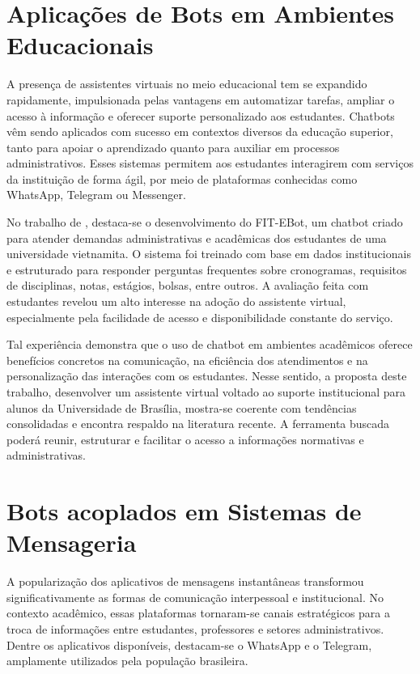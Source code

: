 \section{Aplicações de Bots em Ambientes Educacionais}

A presença de assistentes virtuais no meio educacional tem se expandido rapidamente, impulsionada pelas vantagens em automatizar tarefas, ampliar o acesso à informação e oferecer suporte personalizado aos estudantes. Chatbots vêm sendo aplicados com sucesso em contextos diversos da educação superior, tanto para apoiar o aprendizado quanto para auxiliar em processos administrativos. Esses sistemas permitem aos estudantes interagirem com serviços da instituição de forma ágil, por meio de plataformas conhecidas como WhatsApp, Telegram ou Messenger.

No trabalho de , destaca-se o desenvolvimento do FIT-EBot, um chatbot criado para atender demandas administrativas e acadêmicas dos estudantes de uma universidade vietnamita. O sistema foi treinado com base em dados institucionais e estruturado para responder perguntas frequentes sobre cronogramas, requisitos de disciplinas, notas, estágios, bolsas, entre outros. A avaliação feita com estudantes revelou um alto interesse na adoção do assistente virtual, especialmente pela facilidade de acesso e disponibilidade constante do serviço.

Tal experiência demonstra que o uso de chatbot em ambientes acadêmicos oferece benefícios concretos na comunicação, na eficiência dos atendimentos e na personalização das interações com os estudantes. Nesse sentido, a proposta deste trabalho, desenvolver um assistente virtual voltado ao suporte institucional para alunos da Universidade de Brasília, mostra-se coerente com tendências consolidadas e encontra respaldo na literatura recente. A ferramenta buscada poderá reunir, estruturar e facilitar o acesso a informações normativas e administrativas.

\section{Bots acoplados em Sistemas de Mensageria}

A popularização dos aplicativos de mensagens instantâneas transformou significativamente as formas de comunicação interpessoal e institucional. No contexto acadêmico, essas plataformas tornaram-se canais estratégicos para a troca de informações entre estudantes, professores e setores administrativos. Dentre os aplicativos disponíveis, destacam-se o WhatsApp e o Telegram, amplamente utilizados pela população brasileira.

